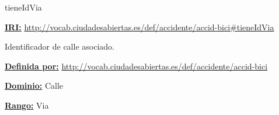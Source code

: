 




\begin{mybox}{tieneIdVia}
\begin{flushleft}
\underline{\textbf{IRI:}}
\url{http://vocab.ciudadesabiertas.es/def/accidente/accid-bici#tieneIdVia}
\newline

Identificador de calle asociado.
\newline

\underline{\textbf{Definida por:}}
\url{http://vocab.ciudadesabiertas.es/def/accidente/accid-bici}
\newline

\underline{\textbf{Dominio:}}
		Calle
\newline

\underline{\textbf{Rango:}}
		Via
\newline


\end{flushleft}
\end{mybox}






